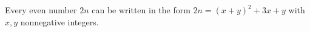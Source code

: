 Every even number $2n$ can be written in the form $2n = (x + y)^2 + 3x + y$ with $x, y$ nonnegative integers.

